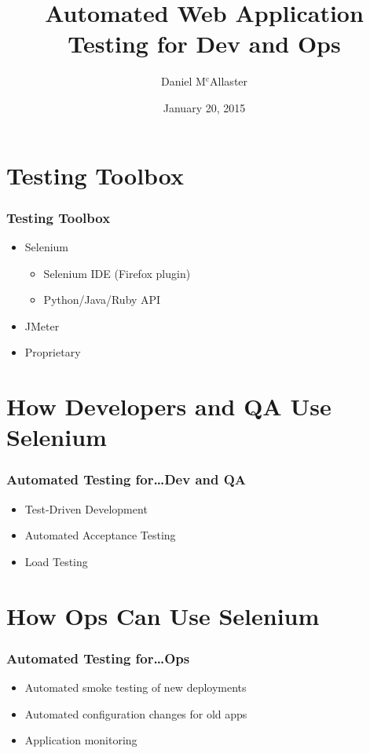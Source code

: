 \documentclass[14pt]{beamer}
\title[Automated Web Application Testing]{Automated Web Application Testing for Dev and Ops}
\author{Daniel M$^\text{c}$Allaster}
\date{January 20, 2015}
\begin{document}
\frame{\titlepage}


\section[Toolbox]{Testing Toolbox}
\label{S:I}
\begin{frame}\frametitle{Testing Toolbox}

\begin{itemize}
\item<+-> Selenium
  \begin{itemize}
  \item<+-> Selenium IDE (Firefox plugin)
  \item<+-> Python/Java/Ruby API
  \end{itemize}
\item<+-> JMeter
\item<+-> Proprietary
\end{itemize}

\end{frame}

\section[Developers]{How Developers and QA Use Selenium}

\begin{frame}
  \frametitle{Automated Testing for\ldots\hfill\bf Dev and QA}
  \begin{itemize}[<+->]
  \item Test-Driven Development
  \item Automated Acceptance Testing
  \item Load Testing
  \end{itemize}
\end{frame}

\section[Ops]{How Ops Can Use Selenium}

\begin{frame}
  \frametitle{Automated Testing for\ldots\hfill\bf Ops}
  \begin{itemize}[<+->]
  \item Automated smoke testing of new deployments
  \item Automated configuration changes for old apps
  \item Application monitoring
  \end{itemize}
\end{frame}
\end{document}
